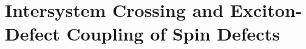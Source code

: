 \def\vac{\text{V}}
\def\vb{\vac_\text{B}}
\def\vn{\vac_\text{N}}
\def\nbvn{\text{N}_\text{B}\vac_\text{N}}
\def\gw{\text{G}_0\text{W}_0@\text{PBE0($\mathrm{\alpha}$)}}
\def\gwrpa{\text{G}_0\text{W}_0+\text{RPA}@\text{PBE0($\mathrm{\alpha}$)}}
\def\gwbse{\text{G}_0\text{W}_0+\text{BSE}@\text{PBE0($\mathrm{\alpha}$)}}
\def\gwrpapbe{\text{G}_0\text{W}_0+\text{RPA}@\text{PBE}}
\def\gwbsepbe{\text{G}_0\text{W}_0+\text{BSE}@\text{PBE}}
\newcommand{\vv}[1]{\text{#1}_{\vac\vac}}
\def\ti{\vv{Ti}}
\def\mo{\vv{Mo}}
\def\sis{\mathrm{Si_{VV}(S)}}
\def\sit{\mathrm{Si_{VV}(T)}}
\newcommand{\xy}[2]{\text{#1}_{\text{#2}}}
\def\gs{\ket{\prescript{3}{0}{A''}}}    %
\def\es{\ket{\prescript{3}{1}{A''}}}    %
\def\pjt{\ket{\prescript{3}{1}{A}}}     %
\def\sin{\ket{\prescript{1}{0}{A'}}}    %
\def\mogs{\ket{\prescript{3}{0}{A}}}    %
\def\moes{\ket{\prescript{3}{1}{A}}}    %
\def\mosin{\ket{\prescript{1}{0}{A}}}    %
\def\nv{\text{NV}}

\section{Intersystem Crossing and Exciton-Defect Coupling of Spin Defects}

